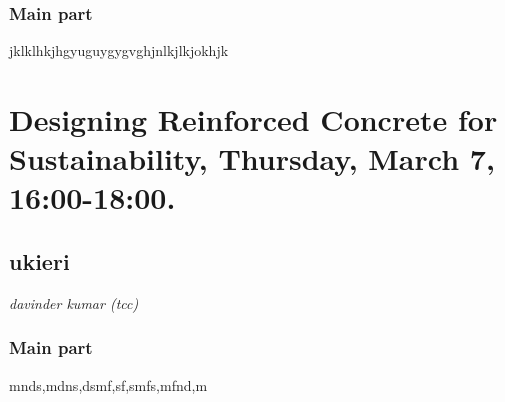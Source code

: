\subsubsection*{Main part}

jklklhkjhgyuguygygvghjnlkjlkjokhjk







\section*{Designing Reinforced Concrete for Sustainability, Thursday, March 7, 16:00-18:00.}


 


\label{3}

\subsection*{ukieri}
\textit{davinder kumar (tcc)}

% 



\subsubsection*{Main part}

mnds,mdns,dsmf,sf,smfs,mfnd,m




 
